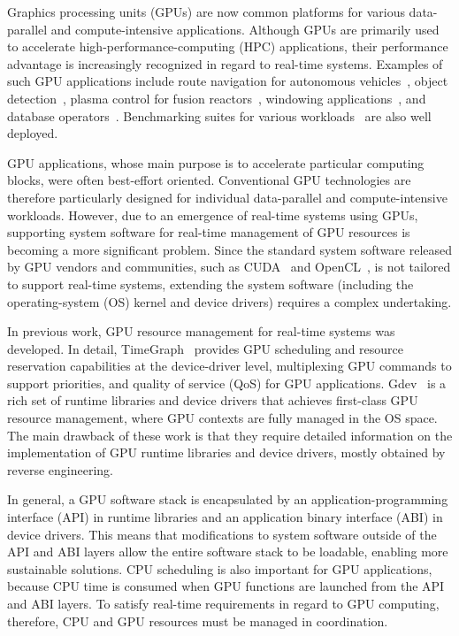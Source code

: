 Graphics processing units (GPUs) are now common platforms for various data-parallel and compute-intensive applications. Although GPUs are primarily used to accelerate high-performance-computing (HPC) applications, their performance advantage is increasingly recognized in regard to real-time systems. Examples of such GPU applications include route navigation for autonomous vehicles~\cite{cmu:routing}, object detection~\cite{hirabayashi:cpsna2013}, plasma control for fusion reactors~\cite{tokamak}, windowing applications~\cite{kato:rtas2011}, and database operators~\cite{bakkum:sql}. Benchmarking suites for various workloads~\cite{rodinia} are also well deployed. 

GPU applications, whose main purpose is to accelerate particular computing blocks, were often best-effort oriented. Conventional GPU technologies are therefore particularly designed for individual data-parallel and compute-intensive workloads. However, due to an emergence of real-time systems using GPUs, supporting system software for real-time management of GPU resources is becoming a more significant problem. Since the standard system software released by GPU vendors and communities, such as CUDA~\cite{nvidia:cuda_zone} and OpenCL~\cite{opencl}, is not tailored to support real-time systems, extending the system software (including the operating-system (OS) kernel and device drivers) requires a complex undertaking.

In previous work, GPU resource management for real-time systems was developed. In detail, TimeGraph~\cite{kato:timegraph} provides GPU scheduling and resource reservation capabilities at the device-driver level, multiplexing GPU commands to support priorities, and quality of service (QoS) for GPU applications. Gdev~\cite{kato:gdev} is a rich set of runtime libraries and device drivers that achieves first-class GPU resource management, where GPU contexts are fully managed in the OS space. The main drawback of these work is that they require detailed information on the implementation of GPU runtime libraries and device drivers, mostly obtained by reverse engineering.

In general, a GPU software stack is encapsulated by an application-programming interface (API) in runtime libraries and an application binary interface (ABI) in device drivers. This means that modifications to system software outside of the API and ABI layers allow the entire software stack to be loadable, enabling more sustainable solutions. CPU scheduling is also important for GPU applications, because CPU time is consumed when GPU functions are launched from the API and ABI layers. To satisfy real-time requirements in regard to GPU computing, therefore, CPU and GPU resources must be managed in coordination.

